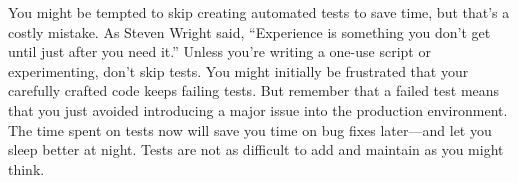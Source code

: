 You might be tempted to skip creating automated tests to save time, but that’s a costly mistake. As Steven Wright said, “Experience is something you don’t get until just after you need it.” Unless you’re writing a one-use script or experimenting, don’t skip tests. You might initially be frustrated that your carefully crafted code keeps failing tests. But remember that a failed test means that you just avoided introducing a major issue into the production environment. The time spent on tests now will save you time on bug fixes later—and let you sleep better at night. Tests are not as difficult to add and maintain as you might think.






















